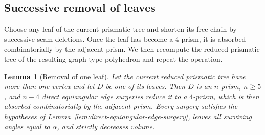 \documentclass[12pt,a4paper]{article}
\newtheorem{lemma}[theorem]{Lemma}
\theoremstyle{definition}
\begin{document}
\subsection{Successive removal of leaves}\label{subsec:graph-collapse}

Choose any leaf of the current prismatic tree and shorten its free chain by
successive seam deletions. Once the leaf has become a \(4\)-prism, it is
absorbed combinatorially by the adjacent prism. We then recompute the reduced
prismatic tree of the resulting graph-type polyhedron and repeat the operation.

\begin{lemma}[Removal of one leaf]\label{lem:leaf-collapse}
Let the current reduced prismatic tree have more than one vertex and let
\(D\) be one of its leaves.  Then \(D\) is an \(n\)-prism, \(n\ge5\), and
\(n-4\) direct equiangular edge surgeries reduce it to a \(4\)-prism, which is
then absorbed combinatorially by the adjacent prism. Every surgery
satisfies the hypotheses of
Lemma~\ref{lem:direct-equiangular-edge-surgery}, leaves all surviving angles
equal to \(\alpha\), and strictly decreases volume.
\end{lemma}
\end{document}
